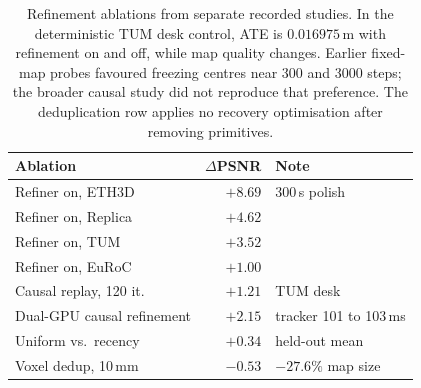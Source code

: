 \begin{table}[t]
\centering\small
\setlength{\tabcolsep}{4pt}
\begin{tabular}{@{}lrl@{}}
\toprule
Ablation & $\Delta$PSNR & Note \\
\midrule
Refiner on, ETH3D   & $+8.69$ & 300\,s polish \\
Refiner on, Replica & $+4.62$ & \\
Refiner on, TUM     & $+3.52$ & \\
Refiner on, EuRoC   & $+1.00$ & \\
\midrule
Causal replay, 120 it. & $+1.21$ & TUM desk \\
Dual-GPU causal refinement & $+2.15$ & tracker 101 to 103\,ms \\
\midrule
Uniform vs.\ recency & $+0.34$ & held-out mean \\
Voxel dedup, 10\,mm & $-0.53$ & $-27.6\%$ map size \\
\bottomrule
\end{tabular}
\caption[Refinement ablations]{Refinement ablations from separate recorded
studies. In the deterministic TUM desk control, ATE is $0.016975$\,m with
refinement on and off, while map quality changes. Earlier fixed-map probes
favoured freezing centres near 300 and 3000 steps; the broader causal study
did not reproduce that preference. The deduplication row applies no recovery
optimisation after removing primitives.}
\label{tab:refiner}
\end{table}
